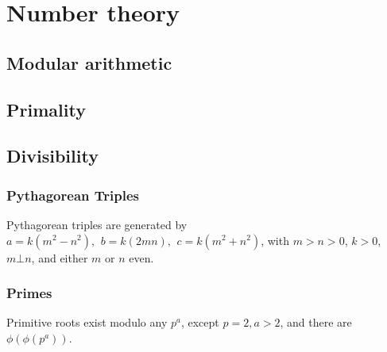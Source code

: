 \chapter{Number theory}

\section{Modular arithmetic}

\section{Primality}

\section{Divisibility}




\subsection{Pythagorean Triples}
 Pythagorean triples are generated by
  $a=k (m^{2}-n^{2}),\ \,b=k(2mn),\ \,c=k(m^{2}+n^{2})$,
 with $m > n > 0$, $k > 0$, $m \bot n$, and either $m$ or $n$ even.

\subsection{Primes}
	Primitive roots exist modulo any $p^a$, except $p = 2, a > 2$, and there are $\phi(\phi(p^a))$.

